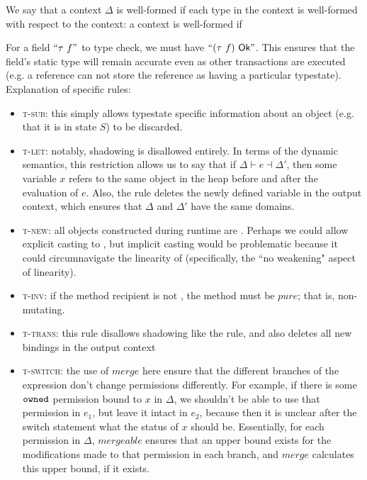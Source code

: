 \documentclass[runningheads,a4paper]{llncs}
\begin{document}
We say that a context $\Delta$ is well-formed if each type in the context is well-formed with respect to the context: a context is well-formed if 

\iffalse

For a field $``\tau\ f"$ to type check, we must have $``(\tau\ f)\ \okS"$. This ensures that the field's static type will remain accurate even as other transactions are executed (e.g. a \readonlyS{} reference can not store the reference as having a particular typestate). \\

Explanation of specific rules:

\begin{itemize}
\item \textsc{t-sub}: this simply allows typestate specific information about an object (e.g. that it is in state $S$) to be discarded.

\item \textsc{t-let}: notably, shadowing is disallowed entirely. In terms of the dynamic semantics, this restriction allows us to say that if $\Delta \vdash e \dashv \Delta'$, then some variable $x$ refers to the same object in the heap before and after the evaluation of $e$. Also, the rule deletes the newly defined variable in the output context, which ensures that $\Delta$ and $\Delta'$ have the same domains.

\item \textsc{t-new}: all objects constructed during runtime are \ownedS{}. Perhaps we could allow explicit casting to \sharedS{}, but implicit casting would be problematic because it could circumnavigate the linearity of \ownedS{} (specifically, the ``no weakening" aspect of linearity).

\item \textsc{t-inv}: if the method recipient is not \ownedS{}, the method must be $pure$; that is, non-mutating.
\item \textsc{t-trans}: this rule disallows shadowing like the  rule, and also deletes all new bindings in the output context
\item \textsc{t-switch}: the use of $merge$ here ensure that the different branches of the expression don't change permissions differently. For example, if there is some $\texttt{owned}{}$ permission bound to $x$ in $\Delta$, we shouldn't be able to use that permission in $e_{1}$, but leave it intact in $e_{2}$, because then it is unclear after the switch statement what the status of $x$ should be. Essentially, for each permission in $\Delta$, $mergeable$ ensures that an upper bound exists for the modifications made to that permission in each branch, and $merge$ calculates this upper bound, if it exists.
\end{itemize}
\end{document}
